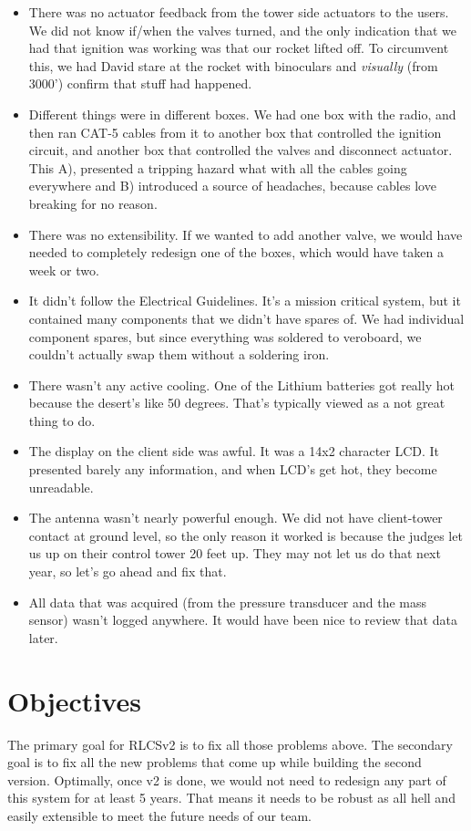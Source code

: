 \documentclass{article}
\begin{document}
        \begin{itemize}
            \item There was no actuator feedback from the tower side actuators to the users. We did not know if/when the valves turned, and the only indication that we had that ignition was working was that our rocket lifted off. To circumvent this, we had David stare at the rocket with binoculars and \emph{visually} (from 3000') confirm that stuff had happened.
            \item Different things were in different boxes. We had one box with the radio, and then ran CAT-5 cables from it to another box that controlled the ignition circuit, and another box that controlled the valves and disconnect actuator. This A), presented a tripping hazard what with all the cables going everywhere and B) introduced a source of headaches, because cables love breaking for no reason.
            \item There was no extensibility. If we wanted to add another valve, we would have needed to completely redesign one of the boxes, which would have taken a week or two.
            \item It didn't follow the Electrical Guidelines. It's a mission critical system, but it contained many components that we didn't have spares of. We had individual component spares, but since everything was soldered to veroboard, we couldn't actually swap them without a soldering iron.
            \item There wasn't any active cooling. One of the Lithium batteries got really hot because the desert's like 50 degrees. That's typically viewed as a not great thing to do.
            \item The display on the client side was awful. It was a 14x2 character LCD. It presented barely any information, and when LCD's get hot, they become unreadable.
            \item The antenna wasn't nearly powerful enough. We did not have client-tower contact at ground level, so the only reason it worked is because the judges let us up on their control tower 20 feet up. They may not let us do that next year, so let's go ahead and fix that.
            \item All data that was acquired (from the pressure transducer and the mass sensor) wasn't logged anywhere. It would have been nice to review that data later.
        \end{itemize}

    \section{Objectives}
        The primary goal for RLCSv2 is to fix all those problems above. The secondary goal is to fix all the new problems that come up while building the second version. Optimally, once v2 is done, we would not need to redesign any part of this system for at least 5 years. That means it needs to be robust as all hell and easily extensible to meet the future needs of our team.
\end{document}

